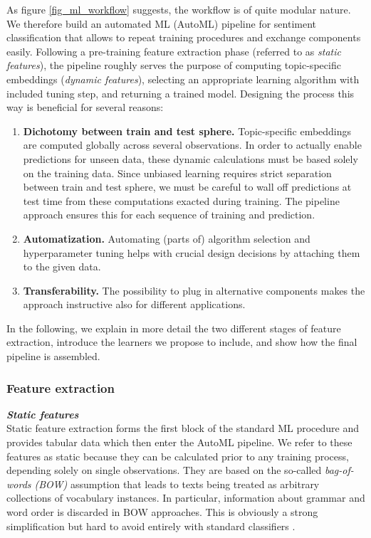 As figure \ref{fig_ml_workflow} suggests, the workflow is of quite modular 
nature.
We therefore build an automated ML (AutoML) pipeline for sentiment 
classification that allows to repeat training procedures and exchange components 
easily.
Following a pre-training feature extraction phase (referred to as 
\textit{static features}), the pipeline roughly serves 
the purpose of computing topic-specific embeddings (\textit{dynamic features}), 
selecting an appropriate learning algorithm with included tuning step, and 
returning a trained model.
Designing the process this way is beneficial for several reasons:

\begin{enumerate}
  \item \textbf{Dichotomy between train and test sphere.} Topic-specific 
  embeddings are computed globally across several observations.
  In order to actually enable predictions for unseen data, these dynamic 
  calculations must be based solely on the training data.
  Since unbiased learning requires strict separation between train and test
  sphere, we must be careful to wall off predictions at test time from these 
  computations exacted during training.
  The pipeline approach ensures this for each sequence of training and 
  prediction.
  \item \textbf{Automatization.} Automating (parts of) algorithm selection and 
  hyperparameter tuning helps with crucial design decisions by attaching them to 
  the given data.
  \item \textbf{Transferability.} The possibility to plug in alternative 
  components makes the 
  approach instructive also for different applications.
\end{enumerate}

In the following, we explain in more detail the two different stages of feature 
extraction, introduce the learners we propose to include, and show how the 
final pipeline is assembled.


\subsubsection{Feature extraction}
\label{tssa_ml_feat}

\textit{\textbf{Static features}}
\\

Static feature extraction forms the first block of the standard ML procedure and 
provides tabular data which then enter the AutoML pipeline.
We refer to these features as static because they can be calculated prior to any 
training process, depending solely on single observations.
They are based on the so-called \textit{bag-of-words 
(BOW)} assumption that leads to texts being treated as arbitrary collections of 
vocabulary instances.
In particular, information about grammar and word order is discarded in BOW 
approaches.
This is obviously a strong simplification but hard to avoid entirely with 
standard classifiers \citep{cambriaetal2017}.


